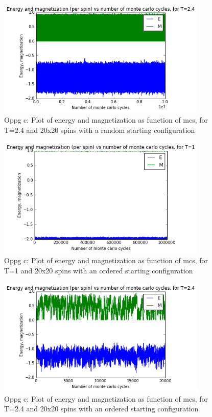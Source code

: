 \documentclass[twocolumn]{article}
\begin{document}
\begin{figure}[h!]
  \centering
  \caption{Oppg c: Plot of energy and magnetization as function of mcs, for T=2.4 and 20x20 spins with a random starting configuration}
  \includegraphics[width=10cm]{E_M_plot_c_2.png}
\end{figure}

\begin{figure}[h!]
  \centering
  \caption{Oppg c: Plot of energy and magnetization as function of mcs, for T=1 and 20x20 spins with an ordered starting configuration}
  \includegraphics[width=10cm]{E_M_plot_c_3.png}
\end{figure}

\begin{figure}[h!]
  \centering
  \caption{Oppg c: Plot of energy and magnetization as function of mcs, for T=2.4 and 20x20 spins with an ordered starting configuration}
  \includegraphics[width=10cm]{E_M_plot_c_4.png}
\end{figure}
\end{document}

